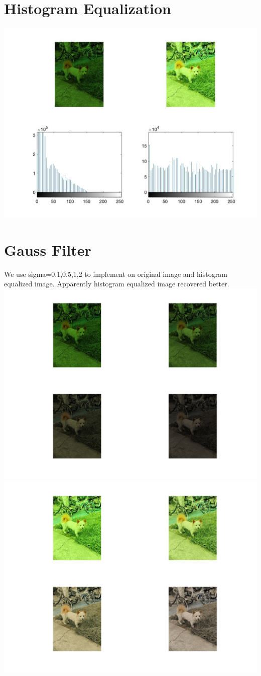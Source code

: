 \documentclass[a4paper]{article}
\begin{document}
\section{Histogram Equalization}
\includegraphics[scale=0.4]{figure3.jpg}
\section{Gauss Filter}
We use sigma=0.1,0.5,1,2 to implement on original image and histogram equalized image. 
Apparently histogram equalized image recovered better.\\
\includegraphics[scale=0.37]{figure4.jpg}
\\
\includegraphics[scale=0.37]{figure5.jpg}
\end{document}
